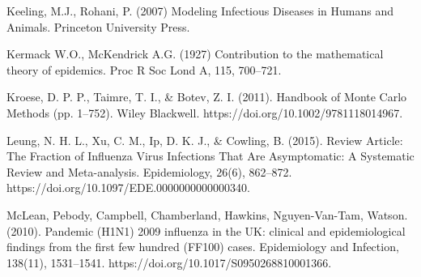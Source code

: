 \begin{thebibliography}{99}
	
	
	
	 Keeling, M.J., Rohani, P. (2007) Modeling Infectious Diseases in Humans and Animals. Princeton University Press.
	
	 Kermack W.O., McKendrick A.G. (1927) Contribution to the mathematical theory of epidemics. Proc R Soc Lond A, 115, 700–721.
	
	
	 Kroese, D. P. P., Taimre, T. I., \& Botev, Z. I. (2011). Handbook of Monte Carlo Methods (pp. 1–752). Wiley Blackwell. https://doi.org/10.1002/9781118014967.
	
	 Leung, N. H. L., Xu, C. M., Ip, D. K. J., \& Cowling, B. (2015). Review Article: The Fraction of Influenza Virus Infections That Are Asymptomatic: A Systematic Review and Meta-analysis. Epidemiology, 26(6), 862–872. https://doi.org/10.1097/EDE.0000000000000340.
	
	
	 McLean, Pebody, Campbell, Chamberland, Hawkins, Nguyen-Van-Tam, Watson. (2010). Pandemic (H1N1) 2009 influenza in the UK: clinical and epidemiological findings from the first few hundred (FF100) cases. Epidemiology and Infection, 138(11), 1531–1541. https://doi.org/10.1017/S0950268810001366.
	
	

\end{thebibliography}
